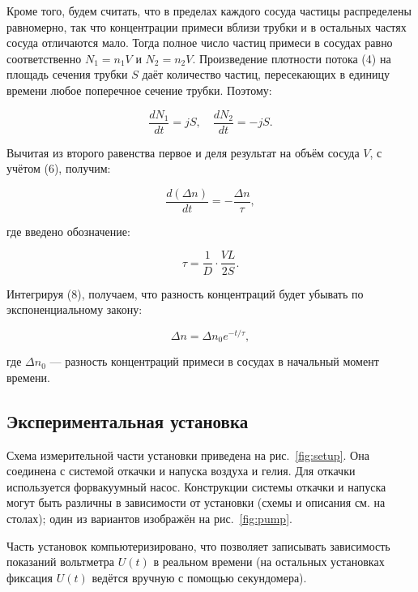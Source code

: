 \documentclass[a4paper,12pt]{article}
\begin{document}
        Кроме того, будем считать, что в пределах каждого сосуда частицы распределены равномерно, так что концентрации примеси вблизи трубки и в остальных частях сосуда отличаются мало. Тогда полное число частиц примеси в сосудах равно соответственно $N_1 = n_1 V$ и $N_2 = n_2 V$. Произведение плотности потока (4) на площадь сечения трубки $S$ даёт количество частиц, пересекающих в единицу времени любое поперечное сечение трубки. Поэтому:
        
        \begin{equation}
            \frac{dN_1}{dt} = jS, \quad \frac{dN_2}{dt} = -jS.
        \end{equation}
        
        Вычитая из второго равенства первое и деля результат на объём сосуда $V$, с учётом (6), получим:
        
        \begin{equation}
            \frac{d(\Delta n)}{dt} = -\frac{\Delta n}{\tau},
        \end{equation}
        
        где введено обозначение:
        
        \begin{equation}
            \tau = \frac{1}{D} \cdot \frac{VL}{2S}.
        \end{equation}
        
        Интегрируя (8), получаем, что разность концентраций будет убывать по экспоненциальному закону:
        
        \begin{equation}
            \Delta n = \Delta n_0 e^{-t/\tau},
        \end{equation}
        
        где $\Delta n_0$ — разность концентраций примеси в сосудах в начальный момент времени. \

        \subsection{Экспериментальная установка}
        Схема измерительной части установки приведена на рис.~\ref{fig:setup}. Она соединена с системой откачки и напуска воздуха и гелия. Для откачки используется форвакуумный насос. Конструкции системы откачки и напуска могут быть различны в зависимости от установки (схемы и описания см. на столах); один из вариантов изображён на рис.~\ref{fig:pump}.

        Часть установок компьютеризировано, что позволяет записывать зависимость показаний вольтметра $U(t)$ в реальном времени (на остальных установках фиксация $U(t)$ ведётся вручную с помощью секундомера).
        
\end{document}
